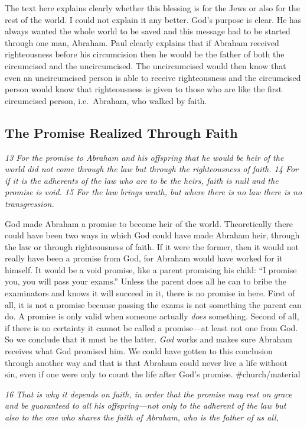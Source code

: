 The text here explains clearly whether this blessing is for the Jews or
also for the rest of the world. I could not explain it any better. God's
purpose is clear. He has always wanted the whole world to be saved and
this message had to be started through one man, Abraham. Paul clearly
explains that if Abraham received righteousness before his circumcision
then he would be the father of both the circumcised and the
uncircumcised. The uncircumcised would then know that even an
uncircumcised person is able to receive righteousness and the
circumcised person would know that righteousness is given to those who
are like the first circumcised person, i.e.~Abraham, who walked by
faith.

\subsection{The Promise Realized Through Faith} \emph{13 For the promise to
Abraham and his offspring that he would be heir of the world did not
come through the law but through the righteousness of faith. 14 For if
it is the adherents of the law who are to be the heirs, faith is null
and the promise is void. 15 For the law brings wrath, but where there is
no law there is no transgression.}

God made Abraham a promise to become heir of the world. Theoretically
there could have been two ways in which God could have made Abraham
heir, through the law or through righteousness of faith. If it were the
former, then it would not really have been a promise from God, for
Abraham would have worked for it himself. It would be a void promise,
like a parent promising his child: ``I promise you, you will pass your
exams.'' Unless the parent does all he can to bribe the examinators and
knows it will succeed in it, there is no promise in here. First of all,
it is not a promise because passing the exams is not something the
parent can do. A promise is only valid when someone actually \emph{does}
something. Second of all, if there is no certainty it cannot be called a
promise---at least not one from God. So we conclude that it must be the
latter. \emph{God} works and makes sure Abraham receives what God
promised him. We could have gotten to this conclusion through another
way and that is that Abraham could never live a life without sin, even
if one were only to count the life after God's promise.
\#church/material

\emph{16 That is why it depends on faith, in order that the promise may
rest on grace and be guaranteed to all his offspring---not only to the
adherent of the law but also to the one who shares the faith of Abraham,
who is the father of us all,}

